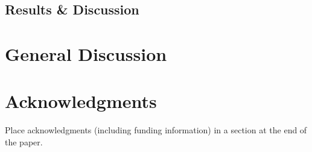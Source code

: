 \documentclass[10pt,letterpaper]{article}
\begin{document}
\subsection{Results \& Discussion}


\section{General Discussion}


\section{Acknowledgments}

Place acknowledgments (including funding information) in a section at
the end of the paper.



\setlength{\bibleftmargin}{.125in}
\setlength{\bibindent}{-\bibleftmargin}


\end{document}
